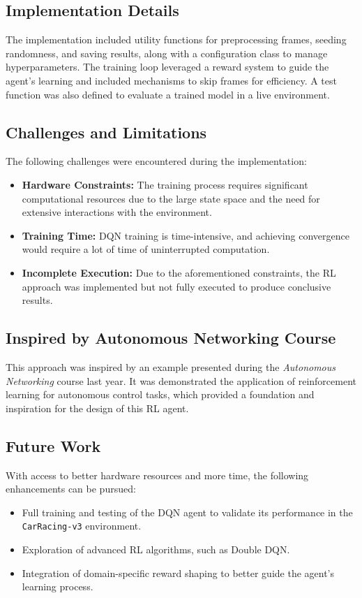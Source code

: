 \documentclass{article}
\begin{document}
\subsection{Implementation Details}

The implementation included utility functions for preprocessing frames, seeding randomness, and saving results, along with a configuration class to manage hyperparameters. The training loop leveraged a reward system to guide the agent's learning and included mechanisms to skip frames for efficiency. A test function was also defined to evaluate a trained model in a live environment.

\subsection{Challenges and Limitations}

The following challenges were encountered during the implementation:
\begin{itemize}
    \item \textbf{Hardware Constraints:} The training process requires significant computational resources due to the large state space and the need for extensive interactions with the environment.
    \item \textbf{Training Time:} DQN training is time-intensive, and achieving convergence would require a lot of time of uninterrupted computation.
    \item \textbf{Incomplete Execution:} Due to the aforementioned constraints, the RL approach was implemented but not fully executed to produce conclusive results.
\end{itemize}

\subsection{Inspired by Autonomous Networking Course}

This approach was inspired by an example presented during the \textit{Autonomous Networking} course last year. It was demonstrated the application of reinforcement learning for autonomous control tasks, which provided a foundation and inspiration for the design of this RL agent.

\subsection{Future Work}

With access to better hardware resources and more time, the following enhancements can be pursued:
\begin{itemize}
    \item Full training and testing of the DQN agent to validate its performance in the \texttt{CarRacing-v3} environment.
    \item Exploration of advanced RL algorithms, such as Double DQN.
    \item Integration of domain-specific reward shaping to better guide the agent's learning process.
\end{itemize}
\end{document}
